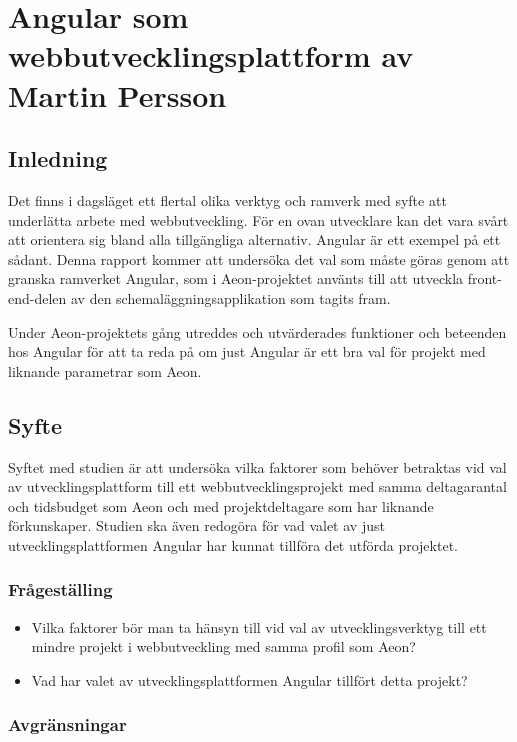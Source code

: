 \chapter{Angular som webbutvecklingsplattform av Martin Persson}

\vspace{1.5em}
\section{Inledning}

Det finns i dagsläget ett flertal olika verktyg och ramverk med syfte att underlätta arbete med webbutveckling. För en ovan utvecklare kan det vara svårt att orientera sig bland alla tillgängliga alternativ. Angular är ett exempel på ett sådant. Denna rapport kommer att undersöka det val som måste göras genom att granska ramverket Angular, som i Aeon-projektet använts till att utveckla front-end-delen av den schemaläggningsapplikation som tagits fram.

Under Aeon-projektets gång utreddes och utvärderades funktioner och beteenden hos Angular för att ta reda på om just Angular är ett bra val för projekt med liknande parametrar som Aeon.

\section{Syfte}

Syftet med studien är att undersöka vilka faktorer som behöver betraktas vid val av utvecklingsplattform till ett webbutvecklingsprojekt med samma deltagarantal och tidsbudget som Aeon och med projektdeltagare som har liknande förkunskaper. Studien ska även redogöra för vad valet av just utvecklingsplattformen Angular har kunnat tillföra det utförda projektet.

\subsection{Frågeställing}
\begin{itemize}
	\item Vilka faktorer bör man ta hänsyn till vid val av utvecklingsverktyg till ett mindre projekt i webbutveckling med samma profil som Aeon?
	\item Vad har valet av utvecklingsplattformen Angular tillfört detta projekt? 
\end{itemize}

\subsection{Avgränsningar}

